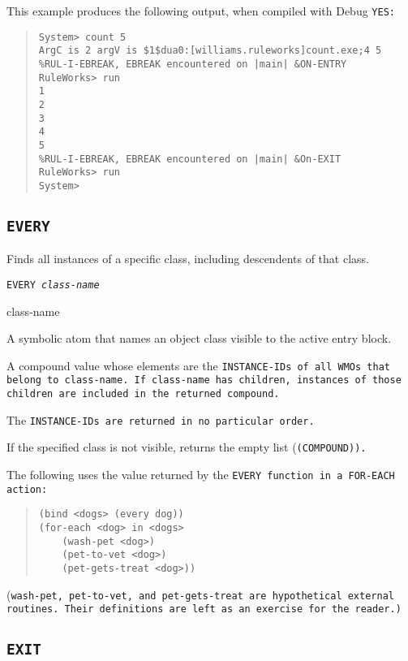 This example produces the following output, when compiled with
Debug \tt{YES}:
\begin{quote}
\begin{verbatim}
System> count 5
ArgC is 2 argV is $1$dua0:[williams.ruleworks]count.exe;4 5
%RUL-I-EBREAK, EBREAK encountered on |main| &ON-ENTRY
RuleWorks> run
1
2
3
4
5
%RUL-I-EBREAK, EBREAK encountered on |main| &On-EXIT
RuleWorks> run
System>
\end{verbatim}
\end{quote}


\subsection{\tt{EVERY}}

Finds all instances of a specific class, including descendents of that
class.

\Format

\tt{EVERY} \it{class-name}

\begin{arguments}
\item[class-name]

  A symbolic atom that names an object class visible to the active
  entry block.
\end{arguments}

\ReturnValue

A compound value whose elements are the \tt{INSTANCE-ID}s of all WMOs
that belong to class-name. If class-name has children, instances of
those children are included in the returned compound.

The \tt{INSTANCE-ID}s are returned in no particular order.

If the specified class is not visible, returns the empty list
(\tt{(COMPOUND)}).

\Example

The following uses the value returned by the \tt{EVERY} function
in a \tt{FOR-EACH} action:
\begin{quote}
\begin{verbatim}
(bind <dogs> (every dog))
(for-each <dog> in <dogs>
    (wash-pet <dog>)
    (pet-to-vet <dog>)
    (pet-gets-treat <dog>))
\end{verbatim}
\end{quote}

(\tt{wash-pet}, \tt{pet-to-vet}, and \tt{pet-gets-treat} are
hypothetical external routines. Their definitions are left as an
exercise for the reader.)

\subsection{\tt{EXIT}}


